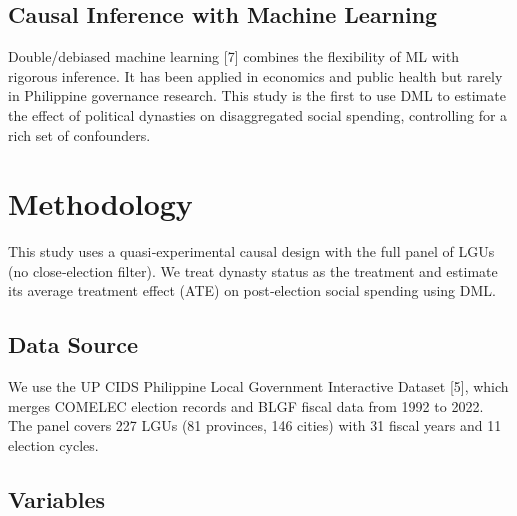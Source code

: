 \documentclass[conference]{IEEEtran}
\begin{document}
\subsection{Causal Inference with Machine Learning}
Double/debiased machine learning [7] combines the flexibility of ML with rigorous inference. It has been applied in economics and public health but rarely in Philippine governance research. This study is the first to use DML to estimate the effect of political dynasties on disaggregated social spending, controlling for a rich set of confounders.

\section{Methodology}

This study uses a quasi‑experimental causal design with the full panel of LGUs (no close‑election filter). We treat dynasty status as the treatment and estimate its average treatment effect (ATE) on post‑election social spending using DML.

\subsection{Data Source}
We use the UP CIDS Philippine Local Government Interactive Dataset [5], which merges COMELEC election records and BLGF fiscal data from 1992 to 2022. The panel covers 227 LGUs (81 provinces, 146 cities) with 31 fiscal years and 11 election cycles.

\subsection{Variables}
\end{document}
